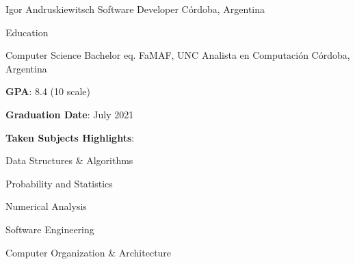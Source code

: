 \documentclass{curriculum}
\begin{document}

\begin{cvheader}

\makeheader
    {Igor Andruskiewitsch}  {}
    {Software Developer}    {}
    {Córdoba, Argentina}    {}

\end{cvheader}


\begin{cvsection}{Education}

    \makesectionitemheader
        {Computer Science Bachelor eq.}                             {FaMAF, UNC}
        {Analista en Computación}                           {Córdoba, Argentina}

        \begin{sectionitemlist}

        \item {
            \textbf{GPA}: 8.4 (10 scale)
        }
        \item {
            \textbf{Graduation Date}: July 2021
        }
        \item {
            \textbf{Taken Subjects Highlights}:
        }
        {
            \begin{colsectionitemlist}{3}
                \item{Data Structures \& Algorithms}
                \item{Probability and Statistics}
                \item{Numerical Analysis}
                \item{Software Engineering}
                \item{Computer Organization \& Architecture}
            \end{colsectionitemlist}
        }

        \end{sectionitemlist}

\end{cvsection}

\end{document}
